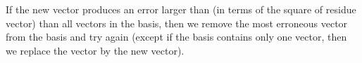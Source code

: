 \documentclass{revtex4-1}
\begin{document}
If the new vector produces an error
larger than (in terms of the square of residue vector)
than all vectors in the basis,
then we remove the most erroneous vector
from the basis and try again
(except if the basis contains only one vector,
then we replace the vector by the new vector).
\end{document}
